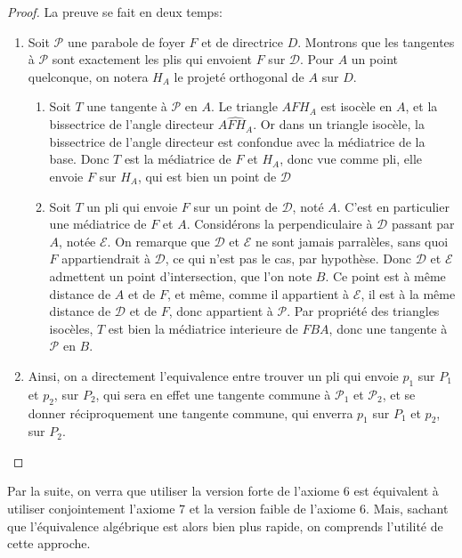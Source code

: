 \documentclass[a4paper,12pt,french,draft]{report}
\begin{document}
			\begin{proof}
				La preuve se fait en deux temps:
				\begin{enumerate}
					\item Soit $\mathcal{P}$  une parabole de foyer $F$ et de directrice $D$. Montrons que les tangentes à $\mathcal{P}$ sont exactement les plis qui envoient $F$ sur $\mathcal{D}$. Pour $A$ un point quelconque, on notera $H_{A}$ le projeté orthogonal de $A$ sur $D$.
					\begin{enumerate}
						\item Soit $T$ une tangente à $\mathcal{P}$ en $A$. Le triangle $AFH_{A}$ est isocèle en $A$, et la bissectrice de l'angle directeur $\widehat{AFH_{A}}$. Or dans un triangle isocèle, la bissectrice de l'angle directeur est confondue avec la médiatrice de la base. Donc $T$ est la médiatrice de $F$ et $H_{A}$, donc vue comme pli, elle envoie $F$ sur $H_{A}$, qui est bien un point de $\mathcal{D}$
						
						\item Soit $T$ un pli qui envoie $F$ sur un point de $\mathcal{D}$, noté $A$. C'est en particulier une médiatrice de $F$ et $A$. Considérons la perpendiculaire à $\mathcal{D}$ passant par $A$, notée $\mathcal{E}$. On remarque que $\mathcal{D}$ et $\mathcal{E}$ ne sont jamais parralèles, sans quoi $F$ appartiendrait à $\mathcal{D}$, ce qui n'est pas le cas, par hypothèse. Donc $\mathcal{D}$ et $\mathcal{E}$ admettent un point d'intersection, que l'on note $B$. Ce point est à même distance de $A$ et de $F$, et même, comme il appartient à $\mathcal{E}$, il est à la même distance de $\mathcal{D}$ et de $F$, donc appartient à $\mathcal{P}$. Par propriété des triangles isocèles, $T$ est bien la médiatrice interieure de $FBA$, donc une tangente à $\mathcal{P}$ en $B$.
					\end{enumerate}
					
					\item Ainsi, on a directement l'equivalence entre trouver un pli qui envoie $p_{1}$ sur $P_{1}$ et $p_{2}$, sur $P_{2}$, qui sera en effet une tangente commune à $\mathcal{P}_{1}$ et $\mathcal{P}_{2}$, et se donner réciproquement une tangente commune, qui enverra $p_{1}$ sur $P_{1}$ et $p_{2}$, sur $P_{2}$.
				\end{enumerate}
			\end{proof}
		Par la suite, on verra que utiliser la version forte de l'axiome 6 est équivalent à utiliser conjointement l'axiome 7 et la version faible de l'axiome 6. Mais, sachant que l'équivalence algébrique est alors bien plus rapide, on comprends l'utilité de cette approche.
	
\end{document}
